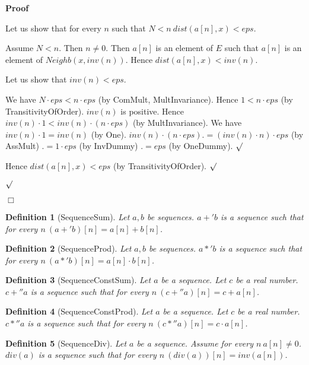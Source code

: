 \documentclass{article}
\newenvironment{forthel}{\begin{leftbar}}{\end{leftbar}}
\newenvironment{proof}{\noindent\textbf{Proof\ }}{\hspace*{\fill}$\Box$\medskip}
\newenvironment{subproof}{\begin{list}{}{}
		\item[\text{Proof}]}{\hfill $\surd$ \end{list}}
\newtheorem{definition}{Definition}
\begin{document}
\begin{forthel}
\begin{proof}
\begin{subproof}
	Let us show that for every $n$ such that $N < n \ dist(a[n],x) < eps$.
	\begin{subproof}
	Assume $N < n$. Then $n \neq 0$.
	Then $a[n]$ is an element of $E$ such that $a[n]$ is an element of $Neighb(x,inv(n))$.
	Hence $dist(a[n],x) < inv(n)$.
	
	Let us show that $inv(n) < eps$.
	\begin{subproof}
	We have $N \cdot eps < n \cdot eps$ (by ComMult, MultInvariance).
	Hence $1 < n \cdot eps$ (by TransitivityOfOrder).
	$inv(n)$ is positive.
	Hence $inv(n) \cdot 1 < inv(n) \cdot (n \cdot eps)$ (by MultInvariance).
	We have $inv(n) \cdot 1 = inv(n)$ (by One).
	$inv(n) \cdot (n \cdot eps) .= (inv(n) \cdot n) \cdot eps$ (by AssMult)
	$.= 1 \cdot eps$ (by InvDummy)
	$.= eps$ (by OneDummy).
	\end{subproof}
	Hence $dist(a[n],x) < eps$ (by TransitivityOfOrder).
	\end{subproof}
	\end{subproof}
	\end{proof}
	
	\begin{definition} [SequenceSum]
	Let $a,b$ be sequences. $a +' b$ is a sequence such that for every $n \ (a +' b)[n] = a[n] + b[n]$.
	\end{definition}
	
	\begin{definition}[SequenceProd]
	Let $a,b$ be sequences. $a *' b$ is a sequence such that for every $n \ (a *' b)[n] = a[n] \cdot b[n]$.
	\end{definition}
	
	\begin{definition} [SequenceConstSum]
	Let $a$ be a sequence. Let $c$ be a real number. $c +'' a$ is a sequence such that for every $n \ (c +'' a)[n] = c + a[n]$.
	\end{definition}
	
	\begin{definition} [SequenceConstProd]
	Let $a$ be a sequence. Let $c$ be a real number. $c *'' a$ is a sequence such that for every $n \ (c *'' a)[n] = c \cdot a[n]$.
	\end{definition}

	\begin{definition} [SequenceDiv]
	Let $a$ be a sequence. Assume for every $n \ a[n] \neq 0$. $div(a)$ is a sequence such that for every $n \ (div(a))[n] = inv(a[n])$.
	\end{definition}
	

\end{forthel}
\end{document}

